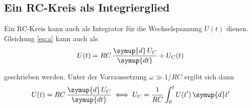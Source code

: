 \subsection{Ein RC-Kreis als Integrierglied}
Ein RC-Kreis kann auch als Integrator für die
Wechselspannung $U(t)$ dienen. Gleichung \ref{eq:a} kann
auch als
\begin{equation}
    U(t)=RC \, \frac{\symup{d}\,U_C}{\symup{dt}}+U_C(t)
\end{equation}

\noindent geschrieben werden. Unter der Vorraussetzung
$\omega \gg 1$/$RC$ ergibt sich dann
\begin{equation}
    U(t)=RC \, \frac{\symup{d}\,U_C}{\symup{dt}} \iff U_C=\frac{1}{RC}\int_0^t U(t')\,\symup{d}t'
\end{equation}
